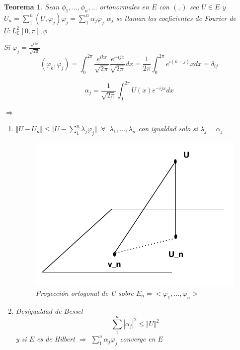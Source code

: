 \documentclass[a4paper,10pt]{book}
\newtheorem{theorem}{Teorema}
\begin{document}
\begin{theorem}
Sean $\phi_1,...,\phi_n,...$ ortonormales en $E$ con $(,)$
sea $U\in E$ y $ U_n = \sum\limits_1^n (U,\varphi_j) \varphi_j = \sum\limits_1^n \alpha_j \varphi_j$
$\alpha_j$ se llaman los coeficientes de Fourier de $U: L^2_{\mathbb{C}} [0,\pi ] , \phi $

Si $\varphi_j = \frac{ e^{ijx} } {\sqrt{2\pi}}$
\[
(\varphi_k,\varphi_j)= \int_0^{2\pi} \frac{e^{ikx}}{\sqrt{ 2\pi}} \frac{e^{-ijx}}{\sqrt{ 2\pi}} dx= \frac{1}{2\pi} \int_0^{2\pi} e^{i(k-j)}x dx = \delta_{ij}
\]

\[
\alpha_j=\frac{1}{\sqrt{2 \pi}} \int_0^{2\pi} U(x) e^{-ijx} dx
\]

$\Rightarrow$

\begin{enumerate}
    \item $\Vert U-U_n \Vert \leq \Vert U - \sum\limits_1^n \lambda_j \varphi_j \Vert \;\; \forall \;\; \lambda_1,\ldots, \lambda_n$ con igualdad solo si $\lambda_j= \alpha_j$

\begin{figure}
    \centering
    \includegraphics[width=0.5\linewidth]{Fig_2.png}
    \caption{Proyección ortogonal de U sobre $E_n= < \varphi_1, \ldots, \varphi_n >$ }
    \label{fig:2}
\end{figure}

\item Desigualdad de Bessel  
\[
\sum_1^{n} |\alpha_j|^2 \leq \Vert U \Vert^2 
\]
y si $E$ es de Hilbert $\Rightarrow$  $\sum\limits_1^n \alpha_j \varphi_j$ converge en $E$ 

\end{enumerate}

\end{theorem}
\end{document}
